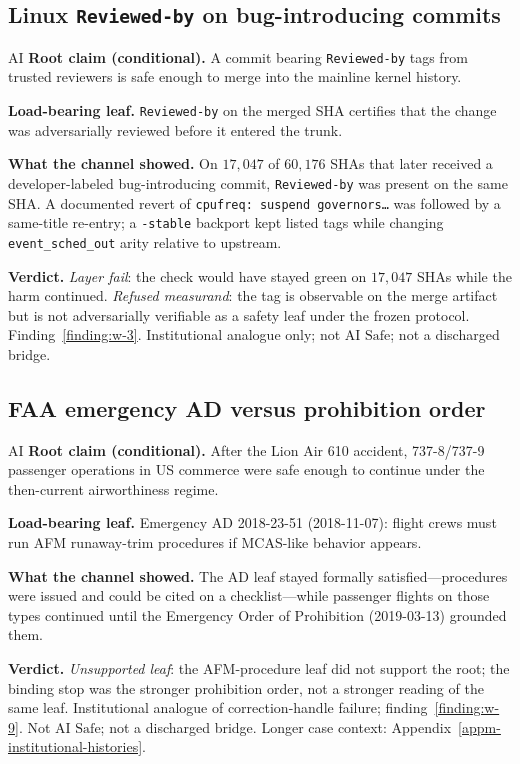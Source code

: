 \subsection{Linux \texttt{Reviewed-by} on bug-introducing commits}
\label{sec:appn-reading-w3}
\begin{authbar}{AI}
\textbf{Root claim (conditional).} A commit bearing \texttt{Reviewed-by} tags from trusted reviewers is safe enough to merge into the mainline kernel history.

\textbf{Load-bearing leaf.} \texttt{Reviewed-by} on the merged SHA certifies that the change was adversarially reviewed before it entered the trunk.

\textbf{What the channel showed.} On $17{,}047$ of $60{,}176$ SHAs that later received a developer-labeled bug-introducing commit, \texttt{Reviewed-by} was present on the same SHA.
A documented revert of \texttt{cpufreq: suspend governors\ldots} was followed by a same-title re-entry; a \texttt{-stable} backport kept listed tags while changing \texttt{event\_sched\_out} arity relative to upstream.

\textbf{Verdict.} \emph{Layer fail}: the check would have stayed green on $17{,}047$ SHAs while the harm continued.
\emph{Refused measurand}: the tag is observable on the merge artifact but is not adversarially verifiable as a safety leaf under the frozen protocol.
Finding~\ref{finding:w-3}.
Institutional analogue only; not AI \(\mathrm{Safe}\); not a discharged bridge.

\end{authbar}
\authbarsubneedspace
\subsection{FAA emergency AD versus prohibition order}
\label{sec:appn-reading-w9}
\begin{authbar}{AI}
\textbf{Root claim (conditional).} After the Lion Air 610 accident, 737-8/737-9 passenger operations in US commerce were safe enough to continue under the then-current airworthiness regime.

\textbf{Load-bearing leaf.} Emergency AD 2018-23-51 (2018-11-07): flight crews must run AFM runaway-trim procedures if MCAS-like behavior appears.

\textbf{What the channel showed.} The AD leaf stayed formally satisfied---procedures were issued and could be cited on a checklist---while passenger flights on those types continued until the Emergency Order of Prohibition (2019-03-13) grounded them.

\textbf{Verdict.} \emph{Unsupported leaf}: the AFM-procedure leaf did not support the root; the binding stop was the stronger prohibition order, not a stronger reading of the same leaf.
Institutional analogue of correction-handle failure; finding~\ref{finding:w-9}.
Not AI \(\mathrm{Safe}\); not a discharged bridge.
Longer case context: Appendix~\ref{appm-institutional-histories}.

\end{authbar}
\authbarsubneedspace
